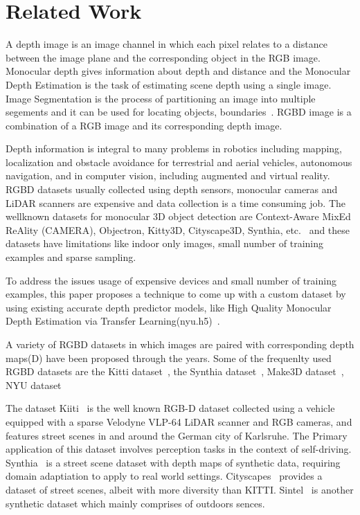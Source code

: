 \documentclass[review]{cvpr}
\begin{document}
\section {Related Work}

A depth image is an image channel in which each pixel relates to a distance between the image plane and the
corresponding object in the RGB image.
Monocular depth gives information about depth and distance and the Monocular Depth Estimation is the task of estimating scene depth 
using a single image\cite{abuolaim2020defocus}. 
Image Segmentation is the process of partitioning an image into multiple segements and it can be used for locating objects, 
boundaries~\cite{amza2012review}. RGBD image is a combination of a RGB image and its corresponding depth image\cite{zhang2018deep}.
 
Depth information is integral to many problems in
robotics including mapping, localization and obstacle avoidance for terrestrial and aerial vehicles, autonomous navigation, 
and in computer vision, including augmented and virtual reality\cite{marchand2015pose}. RGBD datasets usually collected 
using depth sensors, monocular cameras and LiDAR scanners are expensive and data collection is a time consuming job. 
The wellknown datasets for monocular 3D object detection are Context-Aware MixEd ReAlity (CAMERA), Objectron, 
Kitty3D, Cityscape3D, Synthia, etc.~\cite{} and these datasets have 
 limitations like indoor only images, small number of training examples and sparse sampling. 
 
 To address the issues usage of expensive devices and small number of training examples, this paper proposes a 
 technique to come up with a custom dataset by using existing accurate depth predictor models, like High Quality Monocular Depth Estimation 
 via Transfer Learning(nyu.h5)~\cite{alhashim2018high}. 

A variety of RGBD datasets in which images are paired with corresponding depth maps(D) have been proposed through the years.
Some of the frequenlty used RGBD datasets are the Kitti dataset~\cite{geiger2013vision}, the Synthia dataset~\cite{ros2016synthia}, 
Make3D dataset~\cite{saxena2008make3d}, NYU dataset~\cite{silberman2012indoor}

The dataset Kiiti~\cite{geiger2013vision} is the well known RGB-D dataset collected using a vehicle equipped with a sparse 
Velodyne VLP-64 LiDAR scanner and RGB cameras, and features street scenes in and around the German city of Karlsruhe. 
The Primary application of this dataset involves perception tasks in the context of self-driving. 
Synthia~\cite{ros2016synthia} is a street scene dataset with depth maps of synthetic data, 
requiring domain adaptiation to apply to 
real world settings. Cityscapes~\cite{cordts2016cityscapes} provides a dataset of street scenes, 
albeit with more diversity than KITTI. 
Sintel~\cite{mayer2016large} is another synthetic dataset which mainly comprises of outdoors sences.
\end{document}
